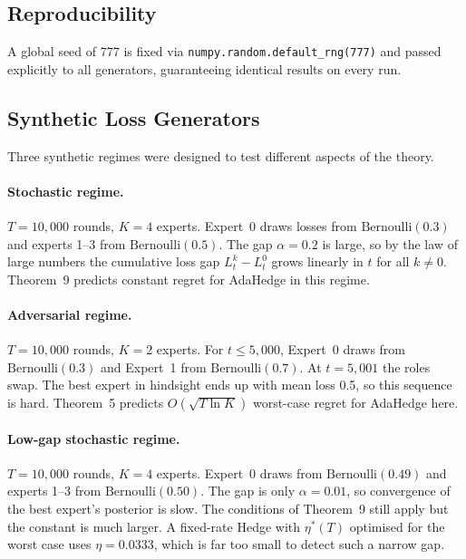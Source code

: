 \documentclass[11pt,a4paper]{article}
\begin{document}
\subsection{Reproducibility}

A global seed of 777 is fixed via \texttt{numpy.random.default\_rng(777)} and passed explicitly to all generators, guaranteeing identical results on every run.

\subsection{Synthetic Loss Generators}

Three synthetic regimes were designed to test different aspects of the theory.

\paragraph{Stochastic regime.}
$T = 10{,}000$ rounds, $K = 4$ experts.  Expert~0 draws losses from
$\mathrm{Bernoulli}(0.3)$ and experts 1--3 from $\mathrm{Bernoulli}(0.5)$.
The gap $\alpha = 0.2$ is large, so by the law of large numbers the cumulative
loss gap $L_t^k - L_t^{0}$ grows linearly in $t$ for all $k \neq 0$.
Theorem~9 predicts constant regret for AdaHedge in this regime.

\paragraph{Adversarial regime.}
$T = 10{,}000$ rounds, $K = 2$ experts.  For $t \le 5{,}000$, Expert~0 draws from
$\mathrm{Bernoulli}(0.3)$ and Expert~1 from $\mathrm{Bernoulli}(0.7)$.  At $t = 5{,}001$
the roles swap. The best expert in hindsight ends up with mean loss 0.5, so this sequence is hard. Theorem~5 predicts $O(\sqrt{T \ln K})$ worst-case regret for AdaHedge here.

\paragraph{Low-gap stochastic regime.}
$T = 10{,}000$ rounds, $K = 4$ experts.  Expert~0 draws from
$\mathrm{Bernoulli}(0.49)$ and experts 1--3 from $\mathrm{Bernoulli}(0.50)$.
The gap is only $\alpha = 0.01$, so convergence of the best expert's posterior
is slow.  The conditions of Theorem~9 still apply but the constant is much
larger.  A fixed-rate Hedge with $\eta^*(T)$ optimised for the worst case uses
$\eta = 0.0333$, which is far too small to detect such a narrow gap.
\end{document}

